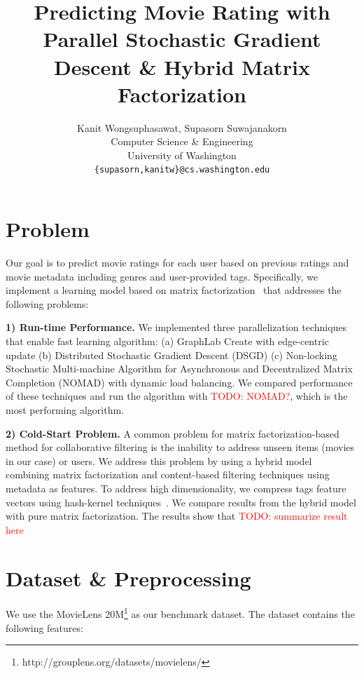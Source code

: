 \documentclass{article} %
\title{Predicting Movie Rating with Parallel Stochastic Gradient Descent \& Hybrid Matrix Factorization}
\author{
Kanit Wongsuphasawat, Supasorn Suwajanakorn \\
Computer Science \& Engineering\\
University of Washington\\
\texttt{\{supasorn,kanitw\}@cs.washington.edu} \\
}
\newcommand{\todo}[1]{\textcolor{red}{TODO: #1}}
\begin{document}
\maketitle



\section{Problem}

Our goal is to predict movie ratings for each user based on previous ratings
and movie metadata including genres and user-provided tags.
Specifically, we implement a learning model based on matrix
factorization~\cite{koren:matrix} that addresses the following problems:

\textbf{1) Run-time Performance.}
We implemented three parallelization techniques that enable fast
learning algorithm:
(a) GraphLab Create with edge-centric update
(b) Distributed Stochastic Gradient Descent (DSGD)
(c) Non-locking Stochastic Multi-machine Algorithm for Asynchronous and Decentralized Matrix Completion (NOMAD) with dynamic load balancing.
We compared performance of these techniques and run the algorithm with
\todo{NOMAD?}, which is the most performing algorithm.


\textbf{2) Cold-Start Problem.}
A common problem for matrix factorization-based method for collaborative
filtering is the inability to address unseen items (movies in our case) or
users.  We address this problem by using a hybrid model combining matrix
factorization and content-based filtering techniques using metadata as
features. To address high dimensionality, we compress tags feature vectors
using hash-kernel techniques~\cite{shi:hashkernels}.  We compare results
from the hybrid model with pure matrix factorization.  The results show that \todo{summarize result here}


\section{Dataset \& Preprocessing}

We use the MovieLens 20M\footnote{http://grouplens.org/datasets/movielens/}
as our benchmark dataset.  The dataset contains the following features:
\end{document}
